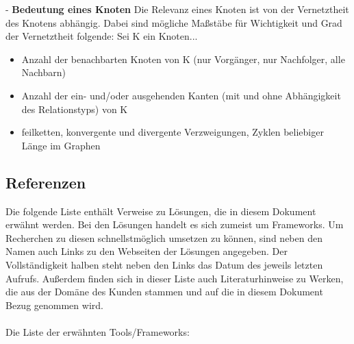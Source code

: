 \documentclass[enabledeprecatedfontcommands,fontsize=11pt,paper=a4,twoside]{scrartcl}
\begin{document}
- \textbf{\hypertarget{Bedeutung eines Knoten}{Bedeutung eines Knoten}} Die Relevanz eines Knoten ist von der Vernetztheit des Knotens abhängig. Dabei sind mögliche Maßstäbe für Wichtigkeit und Grad der Vernetztheit folgende: Sei K ein Knoten... \\
\begin{itemize}
\item Anzahl der benachbarten Knoten von K (nur Vorgänger, nur Nachfolger, alle Nachbarn)
\item Anzahl der ein- und/oder ausgehenden Kanten (mit und ohne Abhängigkeit des Relationstyps) von K
\item feilketten, konvergente und divergente Verzweigungen, Zyklen beliebiger Länge im Graphen
\end{itemize}

\newpage
\subsection{Referenzen} 
Die folgende Liste enthält Verweise zu Lösungen, die in diesem Dokument erwähnt werden. Bei den Lösungen handelt es sich zumeist um Frameworks. Um Recherchen zu diesen schnellstmöglich umsetzen zu können, sind neben den Namen auch Links zu den Webseiten der Lösungen angegeben. Der Vollständigkeit halben steht neben den Links das Datum des jeweils letzten Aufrufs. Außerdem finden sich in dieser Liste auch Literaturhinweise zu Werken, die aus der Domäne des Kunden stammen und auf die in diesem Dokument Bezug genommen wird. \\ \\
Die Liste der erwähnten Tools/Frameworks: \\
\end{document}
